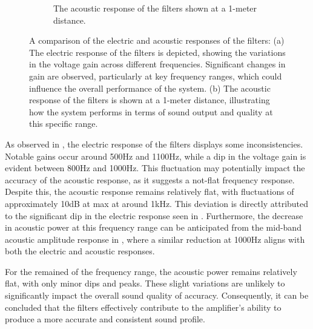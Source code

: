 \begin{figure}[H]
\begin{subfigure}[t]{0.48\textwidth}
        \caption{The acoustic response of the filters shown at a 1-meter distance.}
        \label{fig:frequency_response}
    \end{subfigure}
    \captionsetup{justification=raggedright, labelfont=bf}
    \caption{A comparison of the electric and acoustic responses of the filters: (a) The electric response of the filters is depicted, showing the variations in the voltage gain across different frequencies. Significant changes in gain are observed, particularly at key frequency ranges, which could influence the overall performance of the system. (b) The acoustic response of the filters is shown at a 1-meter distance, illustrating how the system performs in terms of sound output and quality at this specific range.}
    \label{fig:combined_response}
\end{figure}

As observed in , the electric response of the filters displays some inconsistencies. Notable gains occur around 500Hz and 1100Hz, while a dip in the voltage gain is evident between 800Hz and 1000Hz. This fluctuation may potentially impact the accuracy of the acoustic response, as it suggests a not-flat frequency response. Despite this, the acoustic response remains relatively flat, with fluctuations of approximately 10dB at max at around 1kHz. This deviation is directly attributed to the significant dip in the electric response seen in . Furthermore, the decrease in acoustic power at this frequency range can be anticipated from the mid-band acoustic amplitude response in , where a similar reduction at 1000Hz aligns with both the electric and acoustic responses.

For the remained of the frequency range, the acoustic power remains relatively flat, with only minor dips and peaks. These slight variations are unlikely to significantly impact the overall sound quality of accuracy. Consequently, it can be concluded that the filters effectively contribute to the amplifier's ability to produce a more accurate and consistent sound profile.
